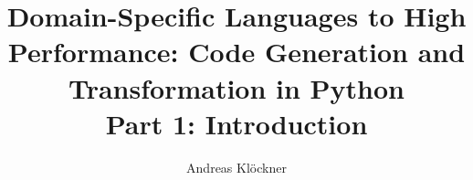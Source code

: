 \documentclass[english,compress]{beamer}
\begin{document}

\title{
  Domain-Specific
  Languages to High Performance: Code Generation and Transformation in
  Python\\
  Part 1: Introduction
}

\author{
  Andreas Klöckner\\
}


\date{}

\frame{
  \titlepage
}
\end{document}
